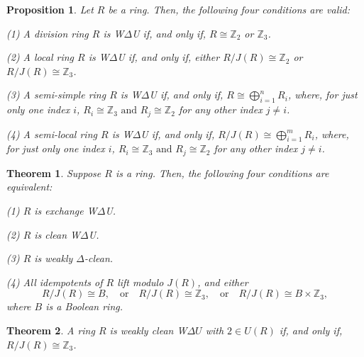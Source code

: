 \documentclass[10pt,a4paper]{amsart}
\newtheorem{proposition}{Proposition}
\newtheorem{theorem}{Theorem}
\begin{document}
\begin{proposition}\label{division}
Let \( R \) be a ring. Then, the following four conditions are valid:
	
(1) A division ring \( R \) is W$\Delta$U if, and only if, \( R \cong \mathbb{Z}_2 \) or \( \mathbb{Z}_3 \).
	
(2) A local ring \( R \) is W$\Delta$U if, and only if, either \( R/J(R) \cong \mathbb{Z}_2 \) or \(R/J(R) \cong  \mathbb{Z}_3 \).
	
(3) A semi-simple ring $R$ is W$\Delta$U if, and only if, $R \cong \bigoplus_{i=1}^n R_i$, where, for just only one index $i$, $R_i\cong \mathbb{Z}_3 \text{ and } R_j\cong \mathbb{Z}_2$ for any other index $j\neq i$.
	
(4) A semi-local ring $R$ is W$\Delta$U if, and only if, $R/J(R) \cong \bigoplus_{i=1}^m R_i$, where, for just only one index $i$, $R_i\cong \mathbb{Z}_3 \text{ and } R_j\cong \mathbb{Z}_2$ for any other index $j\neq i$.	
\end{proposition}

\begin{theorem}\label{main}
Suppose \( R \) is a ring. Then, the following four conditions are equivalent:
	
(1) \( R \) is exchange W$\Delta$U.
	
(2) \( R \) is clean W$\Delta$U.
	
(3) \( R \) is weakly $\Delta$-clean.
	
(4) All idempotents of \( R \) lift modulo \( J(R) \), and either
\[
	R / J(R) \cong B, \quad \text{or} \quad R / J(R) \cong \mathbb{Z}_3, \quad \text{or} \quad R / J(R) \cong B \times \mathbb{Z}_3,
\]
where \( B \) is a Boolean ring.
\end{theorem}

\begin{theorem}\label{fin2}
A ring \( R \) is weakly clean W\(\Delta U\) with \( 2 \in U(R) \) if, and only if, \( R / J(R) \cong \mathbb{Z}_3 \).
\end{theorem}
\end{document}
